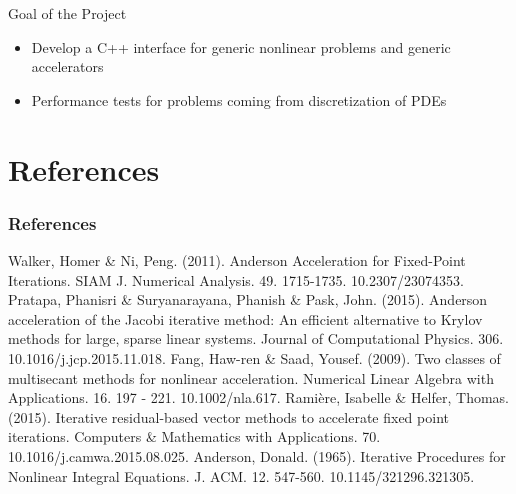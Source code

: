 \documentclass{beamer}
\begin{document}
				\begin{frame}{Goal of the Project}
					\begin{itemize}
						\item Develop a C++ interface for generic nonlinear problems and generic accelerators
						\item Performance tests for problems coming from discretization of PDEs
						
						
					\end{itemize}
					
					
				\end{frame}
				
				
			\section{References}
				
				\begin{frame}
					\frametitle{References}
					\fontsize{6pt}{7.2}\selectfont
					\begin{thebibliography}{99}
						 Walker, Homer \& Ni, Peng. (2011). Anderson Acceleration for Fixed-Point Iterations. SIAM J. Numerical Analysis. 49. 1715-1735. 10.2307/23074353.
						Pratapa, Phanisri \& Suryanarayana, Phanish \& Pask, John. (2015). Anderson acceleration of the Jacobi iterative method: An efficient alternative to Krylov methods for large, sparse linear systems. Journal of Computational Physics. 306. 10.1016/j.jcp.2015.11.018.
						Fang, Haw-ren \& Saad, Yousef. (2009). Two classes of multisecant methods for nonlinear acceleration. Numerical Linear Algebra with Applications. 16. 197 - 221. 10.1002/nla.617.
						Ramière, Isabelle \& Helfer, Thomas. (2015). Iterative residual-based vector methods to accelerate fixed point iterations. Computers \& Mathematics with Applications. 70. 10.1016/j.camwa.2015.08.025.
						Anderson, Donald. (1965). Iterative Procedures for Nonlinear Integral Equations. J. ACM. 12. 547-560. 10.1145/321296.321305.
					\end{thebibliography}
				\end{frame}
			
			
			
			
			
\end{document}
